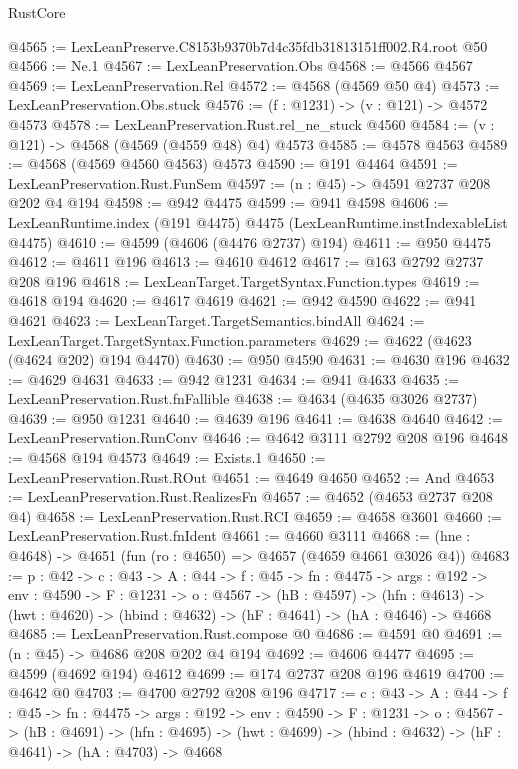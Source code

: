 \begin{lexlean}{RustCore}
\begin{coremodule}
@4565 := LexLeanPreserve.C8153b9370b7d4c35fdb31813151ff002.R4.root @50
@4566 := Ne.{1}
@4567 := LexLeanPreservation.Obs
@4568 := @4566 @4567
@4569 := LexLeanPreservation.Rel
@4572 := @4568 (@4569 @50 @4)
@4573 := LexLeanPreservation.Obs.stuck
@4576 := (f : @1231) -> (v : @121) -> @4572 @4573
@4578 := LexLeanPreservation.Rust.rel_ne_stuck @4560
@4584 := (v : @121) -> @4568 (@4569 (@4559 @48) @4) @4573
@4585 := @4578 @4563
@4589 := @4568 (@4569 @4560 @4563) @4573
@4590 := @191 @4464
@4591 := LexLeanPreservation.Rust.FunSem
@4597 := (n : @45) -> @4591 @2737 @208 @202 @4 @194
@4598 := @942 @4475
@4599 := @941 @4598
@4606 := LexLeanRuntime.index (@191 @4475) @4475 (LexLeanRuntime.instIndexableList @4475)
@4610 := @4599 (@4606 (@4476 @2737) @194)
@4611 := @950 @4475
@4612 := @4611 @196
@4613 := @4610 @4612
@4617 := @163 @2792 @2737 @208 @196
@4618 := LexLeanTarget.TargetSyntax.Function.types
@4619 := @4618 @194
@4620 := @4617 @4619
@4621 := @942 @4590
@4622 := @941 @4621
@4623 := LexLeanTarget.TargetSemantics.bindAll
@4624 := LexLeanTarget.TargetSyntax.Function.parameters
@4629 := @4622 (@4623 (@4624 @202) @194 @4470)
@4630 := @950 @4590
@4631 := @4630 @196
@4632 := @4629 @4631
@4633 := @942 @1231
@4634 := @941 @4633
@4635 := LexLeanPreservation.Rust.fnFallible
@4638 := @4634 (@4635 @3026 @2737)
@4639 := @950 @1231
@4640 := @4639 @196
@4641 := @4638 @4640
@4642 := LexLeanPreservation.RunConv
@4646 := @4642 @3111 @2792 @208 @196
@4648 := @4568 @194 @4573
@4649 := Exists.{1}
@4650 := LexLeanPreservation.Rust.ROut
@4651 := @4649 @4650
@4652 := And
@4653 := LexLeanPreservation.Rust.RealizesFn
@4657 := @4652 (@4653 @2737 @208 @4)
@4658 := LexLeanPreservation.Rust.RCI
@4659 := @4658 @3601
@4660 := LexLeanPreservation.Rust.fnIdent
@4661 := @4660 @3111
@4668 := (hne : @4648) -> @4651 (fun (ro : @4650) => @4657 (@4659 @4661 @3026 @4))
@4683 := {p : @42} ->
  {c : @43} ->
  {A : @44} ->
  {f : @45} ->
  {fn : @4475} ->
  {args : @192} ->
  {env : @4590} ->
  {F : @1231} ->
  {o : @4567} ->
  (hB : @4597) ->
  (hfn : @4613) -> (hwt : @4620) -> (hbind : @4632) -> (hF : @4641) -> (hA : @4646) -> @4668
@4685 := LexLeanPreservation.Rust.compose @0
@4686 := @4591 @0
@4691 := (n : @45) -> @4686 @208 @202 @4 @194
@4692 := @4606 @4477
@4695 := @4599 (@4692 @194) @4612
@4699 := @174 @2737 @208 @196 @4619
@4700 := @4642 @0
@4703 := @4700 @2792 @208 @196
@4717 := {c : @43} ->
  {A : @44} ->
  {f : @45} ->
  {fn : @4475} ->
  {args : @192} ->
  {env : @4590} ->
  {F : @1231} ->
  {o : @4567} ->
  (hB : @4691) ->
  (hfn : @4695) -> (hwt : @4699) -> (hbind : @4632) -> (hF : @4641) -> (hA : @4703) -> @4668

\end{coremodule}
\end{lexlean}
